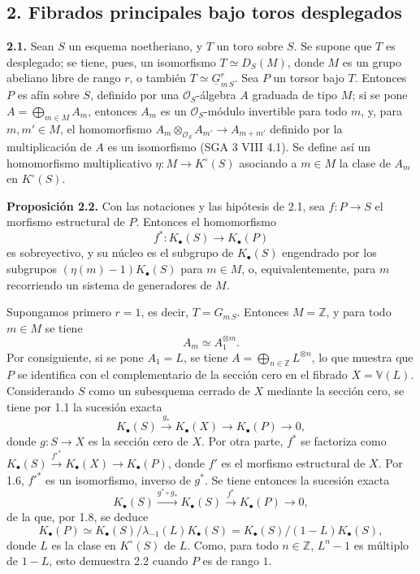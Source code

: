 \providecommand{\sisi}[2]{#2}

\subsection*{2. Fibrados principales bajo toros desplegados}

\textbf{2.1.} Sean $S$ un esquema noetheriano, y $T$ un toro sobre $S$. Se supone que $T$ es desplegado; se tiene, pues, un isomorfismo $T\simeq D_S(M)$, donde $M$ es un grupo abeliano libre de rango $r$, o también $T\simeq \underline G_{m\,S}^r$. Sea $P$ un torsor bajo $T$. Entonces $P$ es afín sobre $S$, definido por una $\mathcal O_S$-álgebra $A$ graduada de tipo $M$; si se pone $A=\bigoplus_{m\in M}A_m$, entonces $A_m$ es un $\mathcal O_S$-módulo invertible para todo $m$, y, para $m,m'\in M$, el homomorfismo $A_m\otimes_{\mathcal O_S}A_{m'}\longrightarrow A_{m+m'}$ definido por la multiplicación de $A$ es un isomorfismo (SGA 3 VIII 4.1). Se define así un homomorfismo multiplicativo $\eta:M\longrightarrow K^\circ(S)$ asociando a $m\in M$ la clase de $A_m$ en $K^\circ(S)$.

\textbf{Proposición 2.2.} Con las notaciones y las hipótesis de 2.1, sea $f:P\to S$ el morfismo estructural de $P$. Entonces el homomorfismo
\[
f^*:K_\bullet(S)\longrightarrow K_\bullet(P)
\]
es sobreyectivo, y su núcleo es el subgrupo de $K_\bullet(S)$ engendrado por los subgrupos $(\eta(m)-1)K_\bullet(S)$ para $m\in M$, o, equivalentemente, para $m$ recorriendo un sistema de generadores de $M$.

Supongamos primero $r=1$, es decir, $T=G_{m\,S}$. Entonces $M=\mathbb Z$, y para todo $m\in M$ se tiene
\[
A_m\simeq A_1^{\otimes m}.
\]
Por consiguiente, si se pone $A_1=L$, se tiene $A=\bigoplus_{n\in\mathbb Z}L^{\otimes n}$, lo que muestra que $P$ se identifica con el complementario de la sección cero en el fibrado $X=\mathbb V(L)$. Considerando $S$ como un subesquema cerrado de $X$ mediante la sección cero, se tiene por 1.1 la sucesión exacta
\[
K_\bullet(S)\xrightarrow{g_*}K_\bullet(X)\longrightarrow K_\bullet(P)\longrightarrow 0,
\]
donde $g:S\to X$ es la sección cero de $X$. Por otra parte, $f^*$ se factoriza como \(K_\bullet(S)\xrightarrow{f'^*}K_\bullet(X)\longrightarrow K_\bullet(P)\), donde $f'$ es el morfismo estructural de $X$. Por 1.6, $f'^*$ es un isomorfismo, inverso de $g^*$. Se tiene entonces la sucesión exacta
\[
K_\bullet(S)\xrightarrow{g^*\circ g_*}K_\bullet(S)\xrightarrow{f^*}K_\bullet(P)\longrightarrow 0,
\]
de la que, por 1.8, se deduce
\[
K_\bullet(P)\simeq K_\bullet(S)/\lambda_{-1}(L)K_\bullet(S)=K_\bullet(S)/(1-L)K_\bullet(S),
\]
donde $L$ es la clase en $K^\circ(S)$ de $L$. Como, para todo $n\in\mathbb Z$, $L^n-1$ es múltiplo de $1-L$, esto demuestra 2.2 cuando $P$ es de rango $1$.

